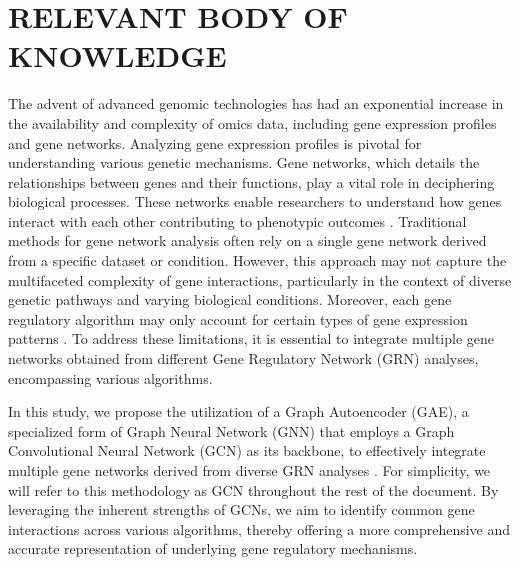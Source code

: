\documentclass{article}
\begin{document}
\section{RELEVANT BODY OF KNOWLEDGE}
The advent of advanced genomic technologies has had an exponential increase in the availability and complexity of omics data, including gene expression profiles and gene networks. Analyzing gene expression profiles is pivotal for understanding various genetic mechanisms. Gene networks, which details the relationships between genes and their functions, play a vital role in deciphering biological processes. These networks enable researchers to understand how genes interact with each other contributing to phenotypic outcomes \cite{Mochida2018}. Traditional methods for gene network analysis often rely on a single gene network derived from a specific dataset or condition. However, this approach may not capture the multifaceted complexity of gene interactions, particularly in the context of diverse genetic pathways and varying biological conditions. Moreover, each gene regulatory algorithm may only account for certain types of gene expression patterns \cite{Mochida2018, Zhao2021, Friedman2000}. To address these limitations, it is essential to integrate multiple gene networks obtained from different Gene Regulatory Network (GRN) analyses, encompassing various algorithms.

In this study, we propose the utilization of a Graph Autoencoder (GAE), a specialized form of Graph Neural Network (GNN) that employs a Graph Convolutional Neural Network (GCN) as its backbone, to effectively integrate multiple gene networks derived from diverse GRN analyses \cite{Chen2020}. For simplicity, we will refer to this methodology as GCN throughout the rest of the document. By leveraging the inherent strengths of GCNs, we aim to identify common gene interactions across various algorithms, thereby offering a more comprehensive and accurate representation of underlying gene regulatory mechanisms.
\end{document}
